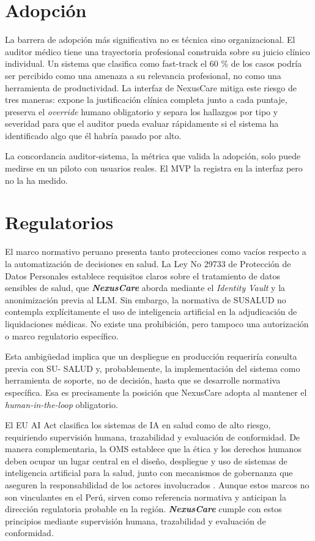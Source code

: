 \section{Adopción}

La barrera de adopción más significativa no es técnica sino organizacional. El auditor médico tiene una trayectoria profesional construida sobre su juicio clínico individual. Un sistema que clasifica como fast-track el 60 \% de los casos podría ser percibido como una amenaza a su relevancia profesional, no como una herramienta de productividad. La interfaz de NexusCare mitiga este riesgo de tres maneras: expone la justificación clínica completa junto a cada puntaje, preserva el \textit{override} humano obligatorio y separa los hallazgos por tipo y severidad para que el auditor pueda evaluar rápidamente si el sistema ha identificado algo que él habría pasado por alto.

La concordancia auditor-sistema, la métrica que valida la adopción, solo puede medirse en un piloto con usuarios reales. El MVP la registra en la interfaz pero no la ha medido.

\section{Regulatorios}

El marco normativo peruano presenta tanto protecciones como vacíos respecto a la automatización de decisiones en salud. La Ley No 29733 de Protección de Datos Personales \cite{peru2011ley29733} establece requisitos claros sobre el tratamiento de datos sensibles de salud, que \textbf{\textit{NexusCare}} aborda mediante el \textit{Identity Vault} y la anonimización previa al LLM. Sin embargo, la normativa de SUSALUD no contempla explícitamente el uso de inteligencia artificial en la adjudicación de liquidaciones médicas. No existe una prohibición, pero tampoco una autorización o marco regulatorio específico.

Esta ambigüedad implica que un despliegue en producción requeriría consulta previa con SU- SALUD y, probablemente, la implementación del sistema como herramienta de soporte, no de decisión, hasta que se desarrolle normativa específica. Esa es precisamente la posición que NexusCare adopta al mantener el \textit{human-in-the-loop} obligatorio.

El EU AI Act \cite{eu2024aiact} clasifica los sistemas de IA en salud como de alto riesgo, requiriendo supervisión humana, trazabilidad y evaluación de conformidad. De manera complementaria, la OMS establece que la ética y los derechos humanos deben ocupar un lugar central en el diseño, despliegue y uso de sistemas de inteligencia artificial para la salud, junto con mecanismos de gobernanza que aseguren la responsabilidad de los actores involucrados \cite{who2021ethics}. Aunque estos marcos no son vinculantes en el Perú, sirven como referencia normativa y anticipan la dirección regulatoria probable en la región. \textbf{\textit{NexusCare}} cumple con estos principios mediante supervisión humana, trazabilidad y evaluación de conformidad.
